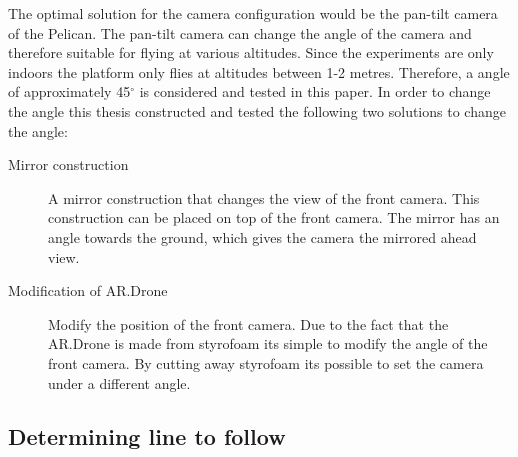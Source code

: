 \documentclass[a4paper]{article}
\begin{document}
The optimal solution for the camera configuration would be the pan-tilt camera of the Pelican. The pan-tilt camera can change the angle of the camera and therefore suitable for flying at various altitudes. Since the experiments are only indoors the platform only flies at altitudes between 1-2 metres. Therefore, a angle of approximately 45$^{\circ}$ is considered and tested in this paper. In order to change the angle this thesis constructed and tested the following two solutions to change the angle:
\begin{description}
\item[Mirror construction] A mirror construction that changes the view of the front camera. This construction can be placed on top of the front camera. The mirror has an angle towards the ground, which gives the camera the mirrored ahead view.
\item[Modification of AR.Drone] Modify the position of the front camera. Due to the fact that the AR.Drone is made from styrofoam its simple to modify the angle of the front camera. By cutting away styrofoam its possible to set the camera under a different angle.
\end{description}
\subsection{Determining line to follow}
\end{document}
